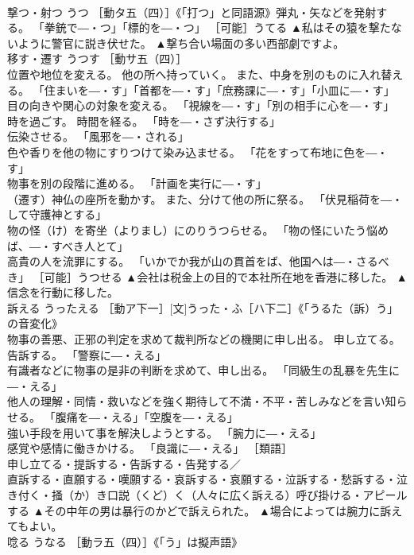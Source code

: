 \documentclass[8pt]{extreport}
\begin{document}
\begin{CJK}{UTF8}{min}
\\	撃つ・射つ	うつ	［動タ五（四）］《「打つ」と同語源》弾丸・矢などを発射する。 「拳銃で―・つ」「標的を―・つ」 ［可能］うてる	▲私はその猿を撃たないように警官に説き伏せた。 ▲撃ち合い場面の多い西部劇ですよ。
\\	移す・遷す	うつす	［動サ五（四）］ 
\\	位置や地位を変える。 他の所へ持っていく。 また、中身を別のものに入れ替える。 「住まいを―・す」「首都を―・す」「庶務課に―・す」「小皿に―・す」 
\\	目の向きや関心の対象を変える。 「視線を―・す」「別の相手に心を―・す」 
\\	時を過ごす。 時間を経る。 「時を―・さず決行する」 
\\	伝染させる。 「風邪を―・される」 
\\	色や香りを他の物にすりつけて染み込ませる。 「花をすって布地に色を―・す」 
\\	物事を別の段階に進める。 「計画を実行に―・す」 
\\	（遷す）神仏の座所を動かす。 また、分けて他の所に祭る。 「伏見稲荷を―・して守護神とする」 
\\	物の怪（け）を寄坐（よりまし）にのりうつらせる。 「物の怪にいたう悩めば、―・すべき人とて」 
\\	高貴の人を流罪にする。 「いかでか我が山の貫首をば、他国へは―・さるべき」 ［可能］うつせる	▲会社は税金上の目的で本社所在地を香港に移した。 ▲信念を行動に移した。
\\	訴える	うったえる	［動ア下一］[文]うった・ふ［ハ下二］《「うるた（訴）う」の音変化》 
\\	物事の善悪、正邪の判定を求めて裁判所などの機関に申し出る。 申し立てる。 告訴する。 「警察に―・える」 
\\	有識者などに物事の是非の判断を求めて、申し出る。 「同級生の乱暴を先生に―・える」 
\\	他人の理解・同情・救いなどを強く期待して不満・不平・苦しみなどを言い知らせる。 「腹痛を―・える」「空腹を―・える」 
\\	強い手段を用いて事を解決しようとする。 「腕力に―・える」 
\\	感覚や感情に働きかける。 「良識に―・える」 ［類語］
\\	申し立てる・提訴する・告訴する・告発する／
\\	直訴する・直願する・嘆願する・哀訴する・哀願する・泣訴する・愁訴する・泣き付く・掻（か）き口説（くど）く（人々に広く訴える）呼び掛ける・アピールする	▲その中年の男は暴行のかどで訴えられた。 ▲場合によっては腕力に訴えてもよい。
\\	唸る	うなる	［動ラ五（四）］《「う」は擬声語》 

\end{CJK}
\end{document}
